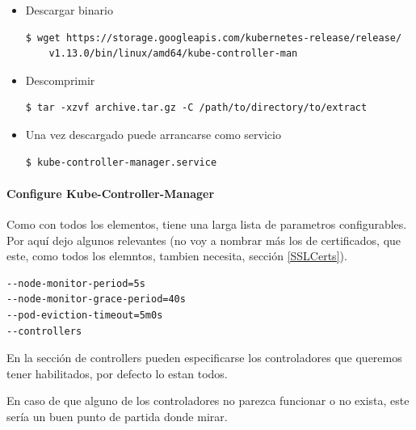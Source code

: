 \documentclass{article}
\newenvironment{codetemplate}[1][]{%
  \mybasecolorbox[#1]
  \itshape
}{%
  \endmybasecolorbox
}
\begin{document}
\begin{itemize}
    \item Descargar binario
\begin{codetemplate}{}
\begin{verbatim}
$ wget https://storage.googleapis.com/kubernetes-release/release/
    v1.13.0/bin/linux/amd64/kube-controller-man
\end{verbatim}
\end{codetemplate}

    \item Descomprimir
\begin{codetemplate}{}
\begin{verbatim}
$ tar -xzvf archive.tar.gz -C /path/to/directory/to/extract
\end{verbatim}
\end{codetemplate} 

    \item Una vez descargado puede arrancarse como servicio
\begin{codetemplate}{}
\begin{verbatim}
$ kube-controller-manager.service
\end{verbatim}
\end{codetemplate}
\end{itemize}

\paragraph{Configure Kube-Controller-Manager}

Como con todos los elementos, tiene una larga lista de parametros configurables. Por aquí dejo algunos relevantes (no voy a nombrar más los de certificados, que este, como todos los elemntos, tambien necesita, sección \ref{SSLCerts}).

\begin{codetemplate}{}
\begin{verbatim}
--node-monitor-period=5s
--node-monitor-grace-period=40s
--pod-eviction-timeout=5m0s
--controllers
\end{verbatim}
\end{codetemplate}

En la sección de controllers pueden especificarse los controladores que queremos tener habilitados, por defecto lo estan todos.

En caso de que alguno de los controladores no parezca funcionar o no exista, este sería un buen punto de partida donde mirar.
\end{document}
